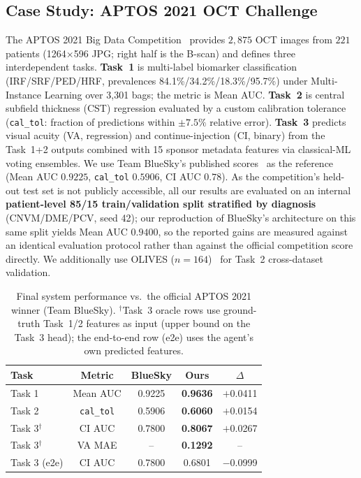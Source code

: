 \documentclass{article}
\begin{document}
\subsection{Case Study: APTOS 2021 OCT Challenge}
The APTOS 2021 Big Data Competition~\cite{Chen2025Predicting} provides $2{,}875$ OCT images from $221$ patients (1264$\times$596 JPG; right half is the B-scan) and defines three interdependent tasks. \textbf{Task~1} is multi-label biomarker classification (IRF/SRF/PED/HRF, prevalences 84.1\%/34.2\%/18.3\%/95.7\%) under Multi-Instance Learning over 3{,}301 bags; the metric is Mean AUC. \textbf{Task~2} is central subfield thickness (CST) regression evaluated by a custom calibration tolerance (\texttt{cal\_tol}: fraction of predictions within $\pm 7.5\%$ relative error). \textbf{Task~3} predicts visual acuity (VA, regression) and continue-injection (CI, binary) from the Task~1+2 outputs combined with 15 sponsor metadata features via classical-ML voting ensembles. We use Team BlueSky's published scores~\cite{Chen2025Predicting} as the reference (Mean AUC $0.9225$, \texttt{cal\_tol} $0.5906$, CI AUC $0.78$). As the competition's held-out test set is not publicly accessible, all our results are evaluated on an internal \textbf{patient-level 85/15 train/validation split stratified by diagnosis} (CNVM/DME/PCV, seed 42); our reproduction of BlueSky's architecture on this same split yields Mean AUC $0.9400$, so the reported gains are measured against an identical evaluation protocol rather than against the official competition score directly. We additionally use OLIVES ($n=164$)~\cite{Prabhushankar2022OLIVES} for Task~2 cross-dataset validation.

\begin{table}[t]
\centering
\caption{Final system performance vs.\ the official APTOS 2021 winner (Team BlueSky). $^\dagger$Task~3 oracle rows use ground-truth Task~1/2 features as input (upper bound on the Task~3 head); the end-to-end row (e2e) uses the agent's own predicted features.}
\label{tab:summary}
\small
\begin{tabular}{lcccc}
\toprule
Task & Metric & BlueSky & Ours & $\Delta$ \\
\midrule
Task 1   & Mean AUC      & 0.9225 & \textbf{0.9636} & $+$0.0411 \\
Task 2   & \texttt{cal\_tol}  & 0.5906 & \textbf{0.6060} & $+$0.0154 \\
Task 3$^\dagger$   & CI AUC        & 0.7800 & \textbf{0.8067} & $+$0.0267 \\
Task 3$^\dagger$   & VA MAE        & --     & \textbf{0.1292} & --        \\
Task 3 (e2e)      & CI AUC        & 0.7800 & 0.6801          & $-$0.0999 \\
\bottomrule
\end{tabular}
\end{table}
\end{document}
